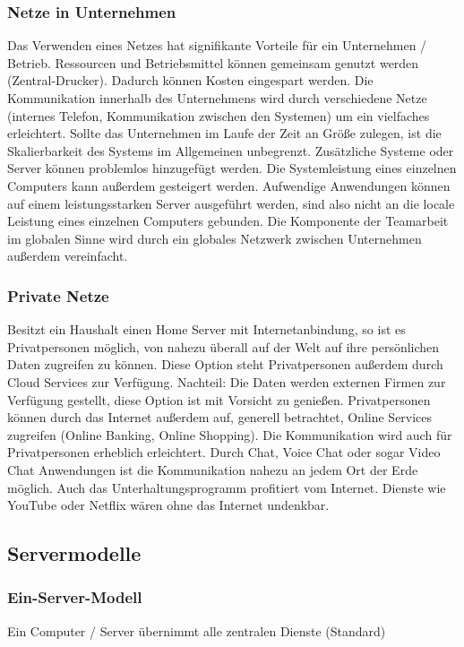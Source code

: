 \documentclass[12pt,a4paper]{article}
\begin{document}
\subsubsection{Netze in Unternehmen}
Das Verwenden eines Netzes hat signifikante Vorteile für ein Unternehmen / Betrieb. Ressourcen und Betriebsmittel können gemeinsam genutzt werden (Zentral-Drucker). Dadurch können Kosten eingespart werden. Die Kommunikation innerhalb des Unternehmens wird durch verschiedene Netze (internes Telefon, Kommunikation zwischen den Systemen) um ein vielfaches erleichtert. Sollte das Unternehmen im Laufe der Zeit an Größe zulegen, ist die Skalierbarkeit des Systems im Allgemeinen unbegrenzt. Zusätzliche Systeme oder Server können problemlos hinzugefügt werden. Die Systemleistung eines einzelnen Computers kann außerdem gesteigert werden. Aufwendige Anwendungen können auf einem leistungsstarken Server ausgeführt werden, sind also nicht an die locale Leistung eines einzelnen Computers gebunden. Die Komponente der Teamarbeit im globalen Sinne wird durch ein globales Netzwerk zwischen Unternehmen außerdem vereinfacht.
\subsubsection{Private Netze}
Besitzt ein Haushalt einen Home Server mit Internetanbindung, so ist es Privatpersonen möglich, von nahezu überall auf der Welt auf ihre persönlichen Daten zugreifen zu können. Diese Option steht Privatpersonen außerdem durch Cloud Services zur Verfügung. Nachteil: Die Daten werden externen Firmen zur Verfügung gestellt, diese Option ist mit Vorsicht zu genießen. Privatpersonen können durch das Internet außerdem auf, generell betrachtet, Online Services zugreifen (Online Banking, Online Shopping). Die Kommunikation wird auch für Privatpersonen erheblich erleichtert. Durch Chat, Voice Chat oder sogar Video Chat Anwendungen ist die Kommunikation nahezu an jedem Ort der Erde möglich. Auch das Unterhaltungsprogramm profitiert vom Internet. Dienste wie YouTube oder Netflix wären ohne das Internet undenkbar.
\subsection{Servermodelle}
\subsubsection{Ein-Server-Modell}
Ein Computer / Server übernimmt alle zentralen Dienste (Standard)
\end{document}
